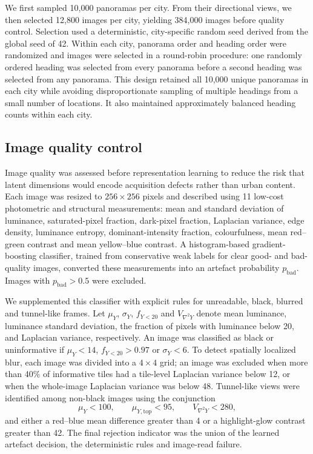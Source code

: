 We first sampled 10,000 panoramas per city. From their directional views, we
then selected 12,800 images per city, yielding 384,000 images before quality
control. Selection used a deterministic, city-specific random seed derived from
the global seed of 42. Within each city, panorama order and heading order were
randomized and images were selected in a round-robin procedure: one randomly
ordered heading was selected from every panorama before a second heading was
selected from any panorama. This design retained all 10,000 unique panoramas in
each city while avoiding disproportionate sampling of multiple headings from a
small number of locations. It also maintained approximately balanced heading
counts within each city.

\subsection{Image quality control}
\label{sec:image_qc}

Image quality was assessed before representation learning to reduce the risk
that latent dimensions would encode acquisition defects rather than urban
content. Each image was resized to $256\times256$ pixels and described using 11
low-cost photometric and structural measurements: mean and standard deviation
of luminance, saturated-pixel fraction, dark-pixel fraction, Laplacian variance,
edge density, luminance entropy, dominant-intensity fraction, colourfulness,
mean red--green contrast and mean yellow--blue contrast. A histogram-based
gradient-boosting classifier, trained from conservative weak labels for clear
good- and bad-quality images, converted these measurements into an artefact
probability $p_{\mathrm{bad}}$. Images with $p_{\mathrm{bad}}>0.5$ were excluded.

We supplemented this classifier with explicit rules for unreadable, black,
blurred and tunnel-like frames. Let $\mu_Y$, $\sigma_Y$, $f_{Y<20}$ and
$V_{\nabla^2Y}$ denote mean luminance, luminance standard deviation, the
fraction of pixels with luminance below 20, and Laplacian variance, respectively.
An image was classified as black or uninformative if
$\mu_Y<14$, $f_{Y<20}>0.97$ or $\sigma_Y<6$. To detect spatially localized blur,
each image was divided into a $4\times4$ grid; an image was excluded when more
than 40\% of informative tiles had a tile-level Laplacian variance below 12, or
when the whole-image Laplacian variance was below 48. Tunnel-like views were
identified among non-black images using the conjunction
\begin{equation}
  \mu_Y < 100, \qquad
  \mu_{Y,\mathrm{top}} < 95, \qquad
  V_{\nabla^2Y} < 280,
  \label{eq:tunnel_gate}
\end{equation}
and either a red--blue mean difference greater than 4 or a highlight-glow
contrast greater than 42. The final rejection indicator was the union of the
learned artefact decision, the deterministic rules and image-read failure.

